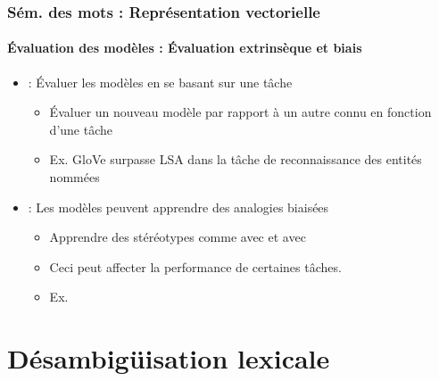 \documentclass[xcolor=table]{beamer}
\begin{document}
\begin{frame}
\frametitle{Sém. des mots : Représentation vectorielle}
\framesubtitle{Évaluation des modèles : Évaluation extrinsèque et biais}
	
\begin{itemize}
	\item  {} : Évaluer les modèles en se basant sur une tâche 
	\begin{itemize}
		\item Évaluer un nouveau modèle par rapport à un autre connu en fonction d'une tâche
		\item Ex. GloVe surpasse LSA dans la tâche de reconnaissance des entités nommées \cite{2014-pennington-al}
	\end{itemize}
	\item {} : Les modèles peuvent apprendre des analogies biaisées
	\begin{itemize}
		\item Apprendre des stéréotypes comme  avec  et  avec  \cite{2017-caliskan-al}
		\item Ceci peut affecter la performance de certaines tâches. 
		\item Ex. 
	\end{itemize}
\end{itemize}
	
\end{frame}


\section{Désambigüisation lexicale}
\end{document}
